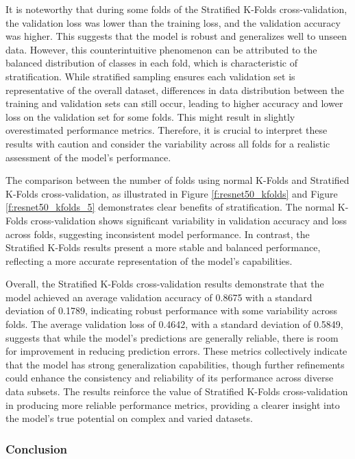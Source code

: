 It is noteworthy that during some folds of the Stratified K-Folds cross-validation, the validation loss was lower than the training loss, and the validation accuracy was higher. This suggests that the model is robust and generalizes well to unseen data. However, this counterintuitive phenomenon can be attributed to the balanced distribution of classes in each fold, which is characteristic of stratification. While stratified sampling ensures each validation set is representative of the overall dataset, differences in data distribution between the training and validation sets can still occur, leading to higher accuracy and lower loss on the validation set for some folds. This might result in slightly overestimated performance metrics. Therefore, it is crucial to interpret these results with caution and consider the variability across all folds for a realistic assessment of the model's performance.

The comparison between the number of folds using normal K-Folds and Stratified K-Folds cross-validation, as illustrated in Figure \ref{f:resnet50_kfolds} and Figure \ref{f:resnet50_kfolds_5} demonstrates clear benefits of stratification. The normal K-Folds cross-validation shows significant variability in validation accuracy and loss across folds, suggesting inconsistent model performance. In contrast, the Stratified K-Folds results present a more stable and balanced performance, reflecting a more accurate representation of the model's capabilities.

Overall, the Stratified K-Folds cross-validation results demonstrate that the model achieved an average validation accuracy of 0.8675 with a standard deviation of 0.1789, indicating robust performance with some variability across folds. The average validation loss of 0.4642, with a standard deviation of 0.5849, suggests that while the model's predictions are generally reliable, there is room for improvement in reducing prediction errors. These metrics collectively indicate that the model has strong generalization capabilities, though further refinements could enhance the consistency and reliability of its performance across diverse data subsets. The results reinforce the value of Stratified K-Folds cross-validation in producing more reliable performance metrics, providing a clearer insight into the model's true potential on complex and varied datasets.

\subsubsection{Conclusion}\label{s:conclusion}

